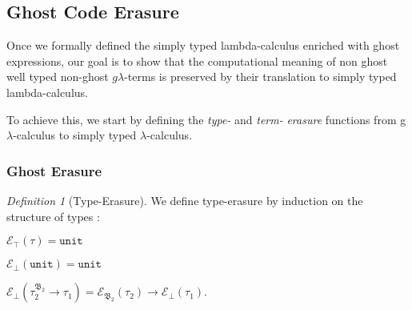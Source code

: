 %
%
%
%
%
\subsection{Ghost Code Erasure}
\newcommand{\e}{\mathcal{E}}
\theoremstyle{remark}
\newtheorem{dfn}[theorem]{Definition}

\qquad Once we formally defined the simply typed lambda-calculus enriched with ghost expressions, our goal is to show that the computational meaning
 of non ghost well typed non-ghost $g\lambda$-terms is preserved by their translation to simply typed lambda-calculus.

To achieve this, we start by defining the \textit{type-} and \textit{term-} \textit{erasure} functions from g$\lambda$-calculus to simply typed  $\lambda$-calculus. 


\subsubsection{Ghost Erasure}


\begin{dfn}[Type-Erasure] 
\label{type-erasure}
We define type-erasure by induction on the structure of types : \vspace{0.2cm} 

\noindent$ \e_{\top}(\tau) = \texttt{unit} $ 

\noindent$ \e_{\bot}(\texttt{unit}) = \texttt{unit}$ 

\noindent$ \e_{\bot}(\tau_{2}^{\mathfrak{B_{2}}} \rightarrow \tau_{1})  
= \e_{\mathfrak{B_{2}}}(\tau_{2}) \rightarrow \e_{\bot}(\tau_{1}) $. \\
\end{dfn} 

